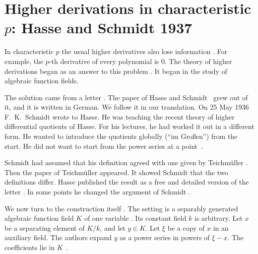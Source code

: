 \section[Higher derivations in characteristic $p$: Hasse and Schmidt 1937][Higher derivations]{Higher derivations in characteristic $p$: Hasse and Schmidt 1937}\label{sec:origins:higher-derivations}

In characteristic $p$ the usual higher derivatives also lose information
\cite[\S 9, p.~213]{Steinitz1910}. For example, the $p$-th derivative of every
polynomial is $0$. The theory of higher derivations began as an answer to this
problem \cite[p.~215]{HasseSchmidt1937}. It began in the study of algebraic
function fields.

The solution came from a letter \cite{HasseSchmidt1937}. The paper of Hasse
and Schmidt~\cite{HasseSchmidt1937} grew out of it, and it is written in
German. We follow it in our translation. On 25 May 1936 F.~K.~Schmidt wrote to
Hasse. He was teaching the recent theory of higher differential quotients of
Hasse. For his lectures, he had worked it out in a different form. He wanted
to introduce the quotients globally (``im Gro\ss en'') from the start. He did
not want to start from the power series at a
point~\cite[p.~215]{HasseSchmidt1937}.

Schmidt had assumed that his definition agreed with one given by Teichm\"uller
\cite{Teichmueller1936}. Then the paper of Teichm\"uller appeared. It showed
Schmidt that the two definitions differ. Hasse published the result as a free
and detailed version of the letter \cite[p.~215]{HasseSchmidt1937}. In some
points he changed the argument of Schmidt \cite[p.~215]{HasseSchmidt1937}.

We now turn to the construction itself \cite[\S 2, p.~217]{HasseSchmidt1937}.
The setting is a separably generated algebraic function field $K$ of one
variable \cite[\S 2, p.~217]{HasseSchmidt1937}. Its constant field $k$ is
arbitrary. Let $x$ be a separating element of $K/k$, and let $y \in K$. Let
$\xi$ be a copy of $x$ in an auxiliary field. The authors expand $y$ as a
power series in powers of $\xi - x$. The coefficients lie in $K$~\cite[\S 2,
p.~217]{HasseSchmidt1937}.

